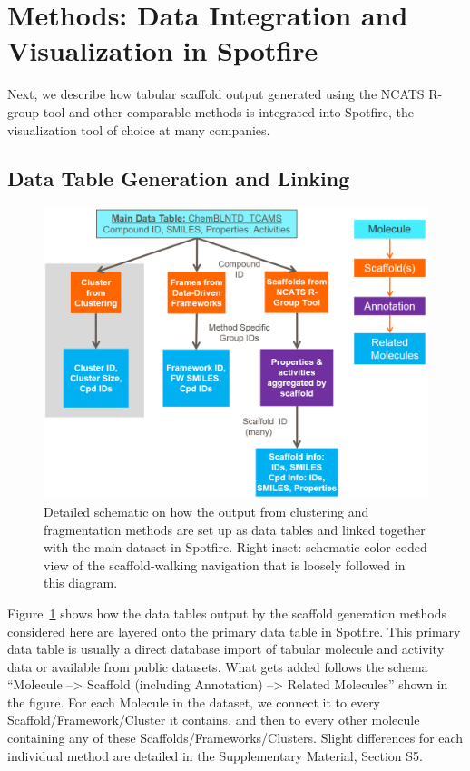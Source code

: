 \documentclass[journal=jacsat,biochem,manuscript=article]{achemso}
\newcommand*\fref[1]{Figure~\ref{fig:#1}}
\begin{document}
\section{Methods: Data Integration and Visualization in Spotfire}
\label{sec:methods2}

Next, we describe how tabular scaffold output generated using the
NCATS R-group tool and other comparable methods is integrated into
Spotfire, the visualization tool of choice at many companies. 

\subsection{Data Table Generation and Linking}

\begin{figure}
\includegraphics[width=6in]{fig/details_all3_noSNG.png}
\caption{Detailed schematic on how the output from clustering and
  fragmentation methods are set up as data tables and linked together
  with the main dataset in Spotfire. Right inset: schematic color-coded
  view of the scaffold-walking navigation that is loosely followed in
  this diagram.}
\label{fig:detaildevil}
\end{figure}

\fref{detaildevil} shows how the data tables output by the scaffold
generation methods considered here are layered onto the primary data
table in Spotfire. This primary data table is usually a direct database
import of tabular molecule and activity data or available from public
datasets. What gets added follows the schema ``Molecule --> Scaffold (including Annotation)
--> Related Molecules'' shown in the figure. For each Molecule in the
dataset, we connect it to every Scaffold/Framework/Cluster it
contains, and then to every other molecule containing any of these
Scaffolds/Frameworks/Clusters. Slight differences for each individual
method are detailed in the Supplementary Material, Section S5.
\end{document}
